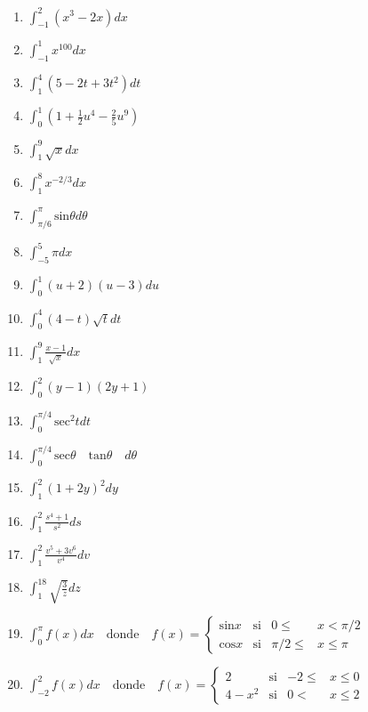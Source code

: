 \documentclass[12pt,]{article}
\begin{document}
\begin{enumerate}
\def\labelenumi{\arabic{enumi}.}
\setcounter{enumi}{12}
\item
  \(\displaystyle\int_{-1}^{2}(x^3-2x)dx\)
\item
  \(\displaystyle\int_{-1}^{1}x^{100}dx\)
\item
  \(\displaystyle\int_{1}^{4}(5-2t+3t^2)dt\)
\item
  \(\displaystyle\int_{0}^{1}(1+\frac{1}{2}u^4-\frac{2}{5}u^9)\)
\item
  \(\displaystyle\int_{1}^{9}\sqrt{x}dx\)
\item
  \(\displaystyle\int_{1}^{8}x^{-2/3}dx\)
\item
  \(\displaystyle\int_{\pi/6}^{\pi}\text{sin}\theta d \theta\)
\item
  \(\displaystyle\int_{-5}^{5}\pi dx\)
\item
  \(\displaystyle\int_{0}^{1}(u+2)(u-3)du\)
\item
  \(\displaystyle\int_{0}^{4}(4-t)\sqrt{t}dt\)
\item
  \(\displaystyle\int_{1}^{9}\frac{x-1}{\sqrt{x}}dx\)
\item
  \(\displaystyle\int_{0}^{2}(y-1)(2y+1)\)
\item
  \(\displaystyle\int_{0}^{\pi/4}\text{sec}^2tdt\)
\item
  \(\displaystyle\int_{0}^{\pi/4}\text{sec}\theta\quad \text{tan}\theta\quad d\theta\)
\item
  \(\displaystyle\int_{1}^{2}(1+2y)^2dy\)
\item
  \(\displaystyle\int_{1}^{2}\frac{s^4+1}{s^2}ds\)
\item
  \(\displaystyle\int_{1}^{2}\frac{v^5+3v^6}{v^4}dv\)
\item
  \(\displaystyle\int_{1}^{18}\sqrt{\frac{3}{z}}dz\)
\item
  \(\displaystyle\int_{0}^{\pi}f(x)dx\quad \text{donde}\quad f(x)=\left\{ \begin{matrix} \text{sin} x & \text{si} & 0\le & x<\pi/2\\ \text{cos} x & \text{si} & \pi/2\le & x\le\pi \end{matrix} \right .\)
\item
  \(\displaystyle\int_{-2}^{2}f(x)dx\quad \text{donde}\quad f(x)=\left\{ \begin{matrix} 2 & \text{si} & -2\le & x \le 0\\ 4 - x^2 & \text{si} & 0 < & x\le 2 \end{matrix} \right .\)
\end{enumerate}
\end{document}
